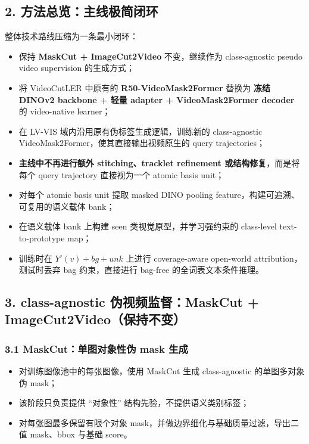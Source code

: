 \documentclass[UTF8]{ctexart}
\begin{document}
\subsection*{2. 方法总览：主线极简闭环}
整体技术路线压缩为一条最小闭环：
\begin{itemize}
\item 保持 \textbf{MaskCut + ImageCut2Video} 不变，继续作为 class-agnostic pseudo video supervision 的生成方式；
\item 将 VideoCutLER 中原有的 \textbf{R50-VideoMask2Former} 替换为 \textbf{冻结 DINOv2 backbone + 轻量 adapter + VideoMask2Former decoder} 的 video-native learner；
\item 在 LV-VIS 域内沿用原有伪标签生成逻辑，训练新的 class-agnostic VideoMask2Former，使其直接输出视频原生的 query trajectories；
\item \textbf{主线中不再进行额外 stitching、tracklet refinement 或结构修复}，而是将每个 query trajectory 直接视为一个 atomic basis unit；
\item 对每个 atomic basis unit 提取 masked DINO pooling feature，构建可追溯、可复用的语义载体 bank；
\item 在语义载体 bank 上构建 seen 类视觉原型，并学习强约束的 class-level text-to-prototype map；
\item 训练时在 $Y'(v)+bg+unk$ 上进行 coverage-aware open-world attribution，测试时丢弃 bag 约束，直接进行 bag-free 的全词表文本条件推理。
\end{itemize}

\par\noindent\hrulefill\par

\subsection*{3. class-agnostic 伪视频监督：MaskCut + ImageCut2Video（保持不变）}

\subsubsection*{3.1 MaskCut：单图对象性伪 mask 生成}
\begin{itemize}
\item 对训练图像池中的每张图像，使用 MaskCut 生成 class-agnostic 的单图多对象伪 mask；
\item 该阶段只负责提供 ``对象性'' 结构先验，不提供语义类别标签；
\item 对每张图最多保留有限个对象 mask，并做边界细化与基础质量过滤，导出二值 mask、bbox 与基础 score。
\end{itemize}
\end{document}
